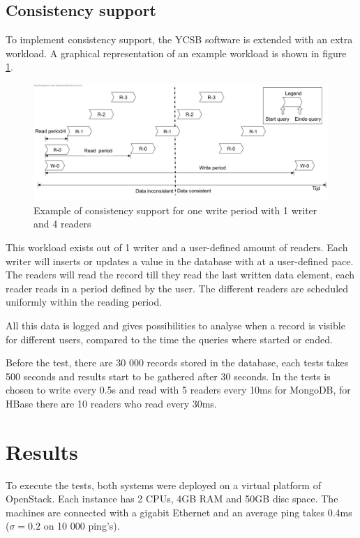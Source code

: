 \documentclass[final,5p,times]{elsarticle}
\begin{document}
\subsection{Consistency support}
To implement consistency support, the YCSB software is extended with an extra workload. A graphical representation of an example workload is shown in figure \ref{fig:consistence-method}. 
\begin{figure}[h]
\centering
\includegraphics[width=\linewidth]{../img/Consistency-test-period}
\caption{Example of consistency support for one write period with 1 writer and 4 readers}
\label{fig:consistence-method}
\end{figure}
This workload exists out of 1 writer and a user-defined amount of readers.  Each writer will inserts or updates a value in the database with at a user-defined pace. The readers will read the record till they read the last written data element, each reader reads in a period defined by the user. The different readers are scheduled uniformly within the reading period. 

All this data is logged and gives possibilities to analyse when a record is visible for different users, compared to the time the queries where started or ended. 

Before the test, there are 30 000 records stored in the database, each tests takes 500 seconds and results start to be gathered after 30 seconds. In the tests is chosen to write every 0.5s and read with 5 readers every 10ms for MongoDB, for HBase there are 10 readers who read every 30ms.  
 

\section{Results}\label{sec:result}
To execute the tests, both systems were deployed on a virtual platform of OpenStack. Each instance has 2 CPUs, 4GB RAM and 50GB disc space. The machines are connected with a gigabit Ethernet and an average ping takes 0.4ms ($\sigma = 0.2$ on 10 000 ping's).
\end{document}
